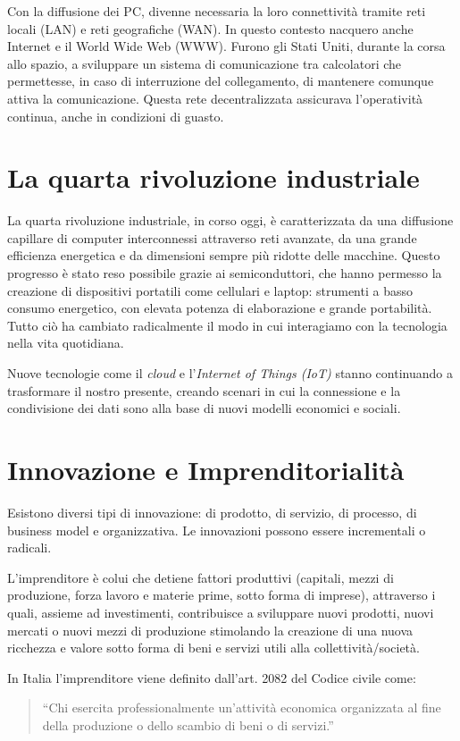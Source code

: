 Con la diffusione dei PC, divenne necessaria la loro connettività tramite reti locali (LAN) e reti geografiche (WAN). In questo contesto nacquero anche Internet e il World Wide Web (WWW). Furono gli Stati Uniti, durante la corsa allo spazio, a sviluppare un sistema di comunicazione tra calcolatori che permettesse, in caso di interruzione del collegamento, di mantenere comunque attiva la comunicazione. Questa rete decentralizzata assicurava l’operatività continua, anche in condizioni di guasto.

\section{La quarta rivoluzione industriale}
La quarta rivoluzione industriale, in corso oggi, è caratterizzata da una diffusione capillare di computer interconnessi attraverso reti avanzate, da una grande efficienza energetica e da dimensioni sempre più ridotte delle macchine. Questo progresso è stato reso possibile grazie ai semiconduttori, che hanno permesso la creazione di dispositivi portatili come cellulari e laptop: strumenti a basso consumo energetico, con elevata potenza di elaborazione e grande portabilità. Tutto ciò ha cambiato radicalmente il modo in cui interagiamo con la tecnologia nella vita quotidiana.

Nuove tecnologie come il \emph{cloud} e l’\emph{Internet of Things (IoT)} stanno continuando a trasformare il nostro presente, creando scenari in cui la connessione e la condivisione dei dati sono alla base di nuovi modelli economici e sociali.
\section{Innovazione e Imprenditorialità}

Esistono diversi tipi di innovazione: di prodotto, di servizio, di processo, di business model e organizzativa. Le innovazioni possono essere incrementali o radicali.

L’imprenditore è colui che detiene fattori produttivi (capitali, mezzi di produzione, forza lavoro e materie prime, sotto forma di imprese), attraverso i quali, assieme ad investimenti, contribuisce a sviluppare nuovi prodotti, nuovi mercati o nuovi mezzi di produzione stimolando la creazione di una nuova ricchezza e valore sotto forma di beni e servizi utili alla collettività/società.

In Italia l’imprenditore viene definito dall’art. 2082 del Codice civile come:
\begin{quote}
    ``Chi esercita professionalmente un’attività economica organizzata al fine della produzione o dello scambio di beni o di servizi.''
\end{quote}

